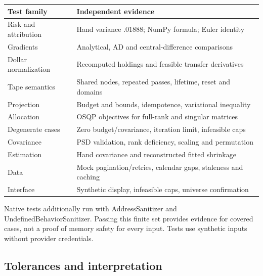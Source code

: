 \documentclass[
  american,
  11pt,
]{article}
\newcounter{none} %
\begin{document}
{\def\LTcaptype{none} %
\begin{longtable}[]{@{}
  >{\raggedright\arraybackslash}p{}
  >{\raggedright\arraybackslash}p{}@{}}
\toprule\noalign{}
\begin{minipage}[b]{\linewidth}\raggedright
Test family
\end{minipage} & \begin{minipage}[b]{\linewidth}\raggedright
Independent evidence
\end{minipage} \\
\midrule\noalign{}
\endhead
\bottomrule\noalign{}
\endlastfoot
Risk and attribution & Hand variance .01888; NumPy formula; Euler
identity \\
Gradients & Analytical, AD and central-difference comparisons \\
Dollar normalization & Recomputed holdings and feasible transfer
derivatives \\
Tape semantics & Shared nodes, repeated passes, lifetime, reset and
domains \\
Projection & Budget and bounds, idempotence, variational inequality \\
Allocation & OSQP objectives for full-rank and singular matrices \\
Degenerate cases & Zero budget/covariance, iteration limit, infeasible
caps \\
Covariance & PSD validation, rank deficiency, scaling and permutation \\
Estimation & Hand covariance and reconstructed fitted shrinkage \\
Data & Mock pagination/retries, calendar gaps, staleness and caching \\
Interface & Synthetic display, infeasible caps, universe confirmation \\
\end{longtable}
}

Native tests additionally run with AddressSanitizer and
UndefinedBehaviorSanitizer. Passing this finite set provides evidence
for covered cases, not a proof of memory safety for every input. Tests
use synthetic inputs without provider credentials.

\subsection{Tolerances and
interpretation}\label{tolerances-and-interpretation}
\end{document}
